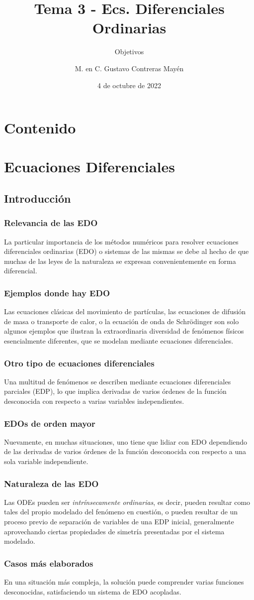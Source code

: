 \documentclass[12pt]{beamer}
\title{Tema 3 - Ecs. Diferenciales Ordinarias}
\subtitle{Objetivos}
\author{M. en C. Gustavo Contreras Mayén}
\date{4 de octubre de 2022}
\begin{document}
\maketitle

\section*{Contenido}

\section{Ecuaciones Diferenciales}
\subsection{Introducción}

\begin{frame}
\frametitle{Relevancia de las EDO}
La particular importancia de los métodos numéricos para resolver ecuaciones diferenciales ordinarias (EDO) o sistemas de las mismas se debe al hecho de que muchas de las leyes de la naturaleza se expresan convenientemente en forma diferencial.
\end{frame}
\begin{frame}
\frametitle{Ejemplos donde hay EDO}
Las ecuaciones clásicas del movimiento de partículas, las ecuaciones de difusión de masa o transporte de calor, o la ecuación de onda de Schrödinger son solo algunos ejemplos que ilustran la extraordinaria diversidad de fenómenos físicos esencialmente diferentes, que se modelan mediante ecuaciones diferenciales.
\end{frame}
\begin{frame}
\frametitle{Otro tipo de ecuaciones diferenciales}
Una multitud de fenómenos se describen mediante ecuaciones diferenciales parciales (EDP), lo que implica derivadas de varios órdenes de la función desconocida con respecto a varias variables independientes. 
\end{frame}
\begin{frame}
\frametitle{EDOs de orden mayor}
Nuevamente, en muchas situaciones, uno tiene que lidiar con EDO dependiendo de las derivadas de varios órdenes de la función desconocida con respecto a una sola variable independiente.
\end{frame}
\begin{frame}
\frametitle{Naturaleza de las EDO}
Las ODEs pueden ser \emph{intrínsecamente ordinarias}, es decir, pueden resultar como tales del propio modelado del fenómeno en cuestión, o pueden resultar de un proceso previo de separación de variables de una EDP inicial, generalmente aprovechando ciertas propiedades de simetría presentadas por el sistema modelado.
\end{frame}
\begin{frame}
\frametitle{Casos más elaborados}
En una situación más compleja, la solución puede comprender varias funciones desconocidas, satisfaciendo un sistema de EDO acopladas.
\end{frame}
\end{document}
